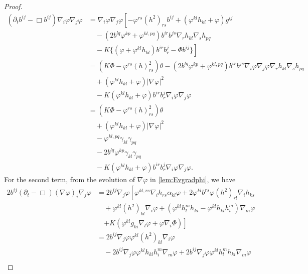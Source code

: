 \documentclass[12pt]{amsart}
\begin{document}
\begin{proof}
\begin{equation}
\begin{split}
(\partial_{t}b^{ij} - \Box b^{ij})\nabla_i \varphi\nabla_j\varphi &= \nabla_i \varphi \nabla_j \varphi\left[-\varphi^{rs} (h^2)_{rs} b^{ij} + (\varphi^{kl}h_{kl} + \varphi) g^{ij} \right. \\
& \quad - \left(2b^{lq}\varphi^{kp} + \varphi^{kl,pq}\right) b^{ir}b^{js} \nabla_r h_{kl} \nabla_s h_{pq} \\
& \quad - \left. K \{(\varphi + \varphi^{kl}h_{kl}) b^{ir}b^{j}_{r} - \Phi b^{ij}\}\right] \\
&= \left(K\Phi - \varphi^{rs}(h)^2_{rs}\right) \theta - (2b^{lq}\varphi^{kp} + \varphi^{kl,pq}) b^{ir}b^{js}\nabla_i\varphi\nabla_j\varphi\nabla_rh_{kl}\nabla_s h_{pq} \\
&\quad + (\varphi^{kl}h_{kl} + \varphi)|\nabla\varphi|^{2} \\
&\quad - K(\varphi^{kl}h_{kl} + \varphi)b^{ir}b^{j}_{r}\nabla_i \varphi\nabla_j\varphi \\
&= \left(K\Phi - \varphi^{rs}(h)^2_{rs}\right) \theta \\
&\quad + (\varphi^{kl}h_{kl} + \varphi)|\nabla\varphi|^{2} \\
&\quad - \varphi^{kl,pq} \gamma_{kl} \gamma_{pq} \\
&\quad - 2b^{lq}\varphi^{kp} \gamma_{kl} \gamma_{pq} \\
&\quad - K(\varphi^{kl}h_{kl} + \varphi)b^{ir}b^{j}_{r}\nabla_i \varphi\nabla_j\varphi.
\end{split}
\end{equation}
For the second term, from the evolution of \(\nabla\varphi\) in \cref{lem:Evgradphi}, we have
\begin{equation}
\label{eq:delt_theta2}
\begin{split}
2 b^{ij} (\partial_{t} - \Box) (\nabla\varphi)_i \nabla_j\varphi &= 2 b^{ij} \nabla_j\varphi \left[\varphi^{kl,rs}\nabla_i h_{rs} \alpha_{kl}\varphi + 2 \varphi^{kl} b^{rs} \varphi(h^2)_{rl} \nabla_i h_{ks} \right. \\
&\quad + \varphi^{kl}(h^2)_{kl}\nabla_i \varphi + \left(\varphi^{kl}h^{m}_{l}h_{ki} - \varphi^{kl}h_{kl}h^{m}_{i}\right) \nabla_m \varphi\\
&\quad \left. + K\left(\varphi^{kl}g_{ki} \nabla_l \varphi + \varphi \nabla_i \Phi\right)\right] \\
&= 2 b^{ij} \nabla_j\varphi \varphi^{kl}(h^2)_{kl}\nabla_i \varphi \\
&\quad - 2 b^{ij} \nabla_j\varphi \varphi^{kl}h_{kl}h^{m}_{i} \nabla_m \varphi + 2 b^{ij} \nabla_j\varphi \varphi^{kl}h^{m}_{l}h_{ki} \nabla_m \varphi \\

\end{split}
\end{equation}
\end{proof}
\end{document}
